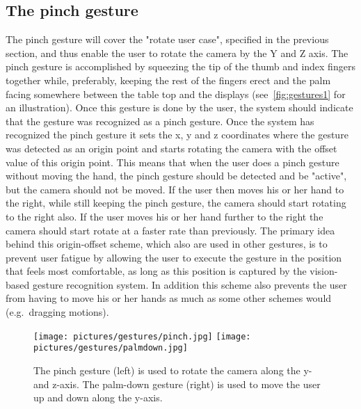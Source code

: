 \subsection{The pinch gesture}
The pinch gesture will cover the "rotate user case", specified in the previous section, and thus enable the user to rotate the camera by the Y and Z axis. 
The pinch gesture is accomplished by squeezing the tip of the thumb and index fingers together while, preferably, keeping the rest of the fingers erect and the palm facing 
somewhere between the table top and the displays (see~\vref{fig:gestures1} for an illustration). Once this gesture is done by the user, 
the system should indicate that the gesture was recognized as a pinch gesture.
Once the system has recognized the pinch gesture it sets the x, y and z coordinates where the gesture was detected as an origin point and starts rotating the 
camera with the offset value of this origin point. This means that when the user does a pinch gesture without moving the hand, the pinch gesture should be detected and be
"active", but the camera should not be moved. If the user then moves his or her hand to the right, while still keeping the pinch gesture, the camera should start rotating 
to the right also. If the user moves his or her hand further to the right the camera should start rotate at a faster rate than previously.  
The primary idea behind this origin-offset scheme, which also are used in other gestures, is to prevent user fatigue by allowing the user to execute
the gesture in the position that feels most comfortable, as long as this position is captured by the vision-based gesture recognition system. 
In addition this scheme also prevents the user from having to move his or her hands as much as some other schemes would (e.g.~dragging motions).  

\begin{figure}%
	\texttt{[image: pictures/gestures/pinch.jpg]}
    \texttt{[image: pictures/gestures/palmdown.jpg]}
	\caption[The pinch and palm-down gestures]{The pinch gesture (left) is used to rotate the camera along the y- and z-axis. 
             The palm-down gesture (right) is used to move the user up and down along the y-axis.}
	\label{fig:gestures1}
\end{figure} 


